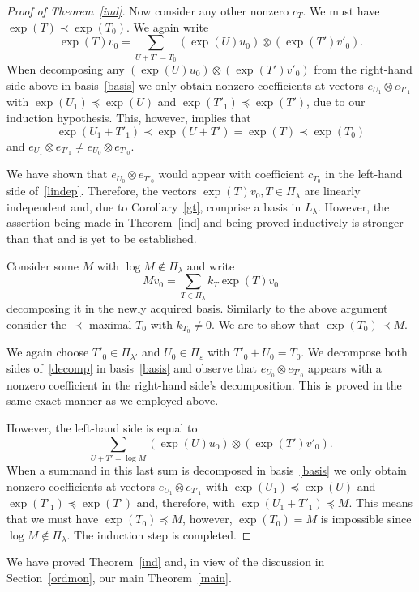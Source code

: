 \documentclass[10pt,a4paper]{article}
\theoremstyle{remark}\newtheorem{rema}[theo]{Remark}
\newcommand{\la}{\lambda}
\begin{document}
\begin{proof}[Proof of Theorem~\ref{ind}]
Now consider any other nonzero $c_T$. We must have $\exp(T)\prec\exp(T_0)$. We again write
\[
\exp(T)v_0=\sum_{U+T'=T_0}(\exp(U)u_0)\otimes(\exp(T')v'_0).
\]
When decomposing any $(\exp(U)u_0)\otimes(\exp(T')v'_0)$ from the right-hand side above in basis~\eqref{basis} we only obtain nonzero coefficients at vectors $e_{U_1}\otimes e_{T'_1}$ with $\exp(U_1)\preceq\exp(U)$ and $\exp(T'_1)\preceq\exp(T')$, due to our induction hypothesis. This, however, implies that
\[
\exp(U_1+T'_1)\prec\exp(U+T')=\exp(T)\prec\exp(T_0)
\]
and $e_{U_1}\otimes e_{T'_1}\neq e_{U_0}\otimes e_{T'_0}$.

We have shown that $e_{U_0}\otimes e_{T'_0}$ would appear with coefficient $c_{T_0}$ in the left-hand side of~\eqref{lindep}. Therefore, the vectors $\exp(T)v_0,T\in\Pi_\la$ are linearly independent and, due to Corollary~\ref{gt}, comprise a basis in $L_\la$. However, the assertion being made in Theorem~\ref{ind} and being proved inductively is stronger than that and is yet to be established.

Consider some $M$ with $\log M\notin\Pi_\la$ and write
\begin{equation}\label{decomp}
Mv_0=\sum_{T\in\Pi_\la}k_T\exp(T)v_0
\end{equation}
decomposing it in the newly acquired basis. Similarly to the above argument consider the $\prec$-maximal $T_0$ with $k_{T_0}\neq 0$. We are to show that $\exp(T_0)\prec M$.

We again choose $T'_0\in\Pi_{\la'}$ and $U_0\in\Pi_\varepsilon$ with $T'_0+U_0=T_0$. We decompose both sides of~\eqref{decomp} in basis~\eqref{basis} and observe that $e_{U_0}\otimes e_{T'_0}$ appears with a nonzero coefficient in the right-hand side's decomposition. This is proved in the same exact manner as we employed above.

However, the left-hand side is equal to
\[
\sum_{U+T'=\log M}(\exp(U)u_0)\otimes(\exp(T')v'_0).
\]
When a summand in this last sum is decomposed in basis~\eqref{basis} we only obtain nonzero coefficients at vectors $e_{U_1}\otimes e_{T'_1}$ with $\exp(U_1)\preceq\exp(U)$ and $\exp(T'_1)\preceq\exp(T')$ and, therefore, with $\exp(U_1+T'_1)\preceq M$. This means that we must have $\exp(T_0)\preceq M$, however, $\exp(T_0)=M$ is impossible since $\log M\notin\Pi_\la$. The induction step is completed.
\end{proof}

We have proved Theorem~\ref{ind} and, in view of the discussion in Section~\ref{ordmon}, our main Theorem~\ref{main}.
\end{document}

